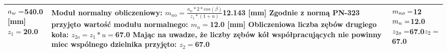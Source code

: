 \documentclass{article}%
\begin{document}
\begin{longtable}{|p{3cm}|p{7cm}|p{3cm}|}
\hline%
$ \newline \newline \newline a_w = $540.0 [mm] \newline $z_1 = $20.0&Moduł normalny obliczeniowy: \newline  \newline $m_{no} = \frac{a_w * 2 * cos(\beta)}{z_1 * (1 + u)}$12.143 [mm] \newline  \newline Zgodnie z normą PN-323 przyjęto wartość modułu normalnego: \newline  \newline $m_n = $12.0 [mm] \newline  \newline Obliczeniowa liczba zębów drugiego koła: \newline  \newline $z_{2o} = z_1 * u = $67.0  \newline \newline  Mając na uwadze, że liczby zębów kół współpracujących nie powinny miec wspólnego dzielnika przyjęto:  \newline  \newline $z_2 = $67.0&$ \newline \newline  m_{no} = $12$ \newline  \newline  \newline  \newline  \newline m_n = $12.0$ \newline  \newline  \newline  \newline z_{2o} = $67.0$ \newline  \newline  \newline  \newline  \newline  \newline z_2 = $67.0\\%
\hline%

\end{longtable}
\end{document}

